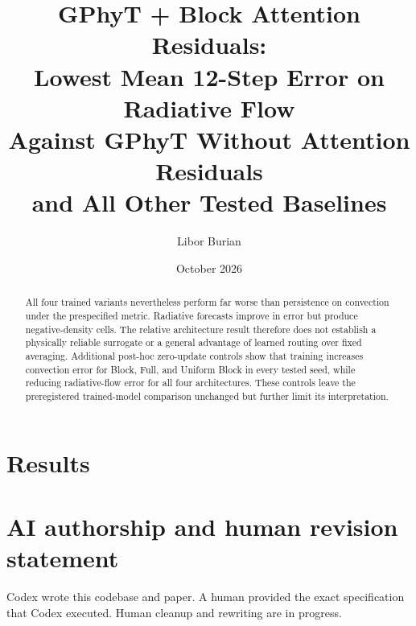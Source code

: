 \documentclass[11pt]{article}
\title{GPhyT + Block Attention Residuals:\\Lowest Mean 12-Step Error on Radiative Flow\\Against GPhyT Without Attention Residuals\\and All Other Tested Baselines}
\author{Libor Burian}
\date{October 2026}
\begin{document}
\maketitle
\begin{abstract}

All four trained variants nevertheless perform far worse than persistence on convection under the prespecified metric. Radiative forecasts improve in error but produce negative-density cells. The relative architecture result therefore does not establish a physically reliable surrogate or a general advantage of learned routing over fixed averaging.
Additional post-hoc zero-update controls show that training increases convection error for Block, Full, and Uniform Block in every tested seed, while reducing radiative-flow error for all four architectures. These controls leave the preregistered trained-model comparison unchanged but further limit its interpretation.
\end{abstract}

\section{Results}

\FloatBarrier


\appendix

\section*{AI authorship and human revision statement}
Codex wrote this codebase and paper. A human provided the exact specification that Codex executed. Human cleanup and rewriting are in progress.
\end{document}
